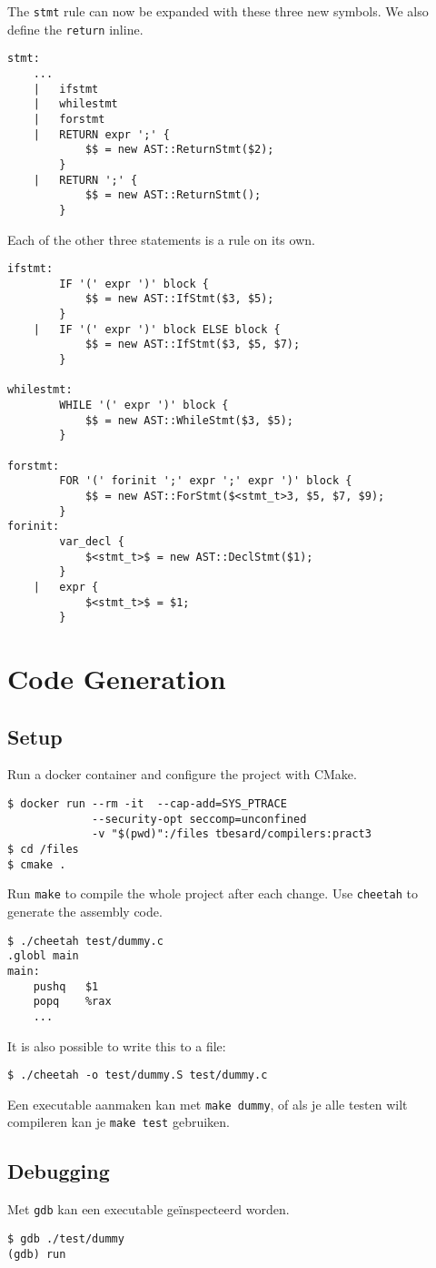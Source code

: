 \documentclass{report}
\begin{document}
The \texttt{stmt} rule can now be expanded with these three new symbols. We also define the \texttt{return} inline.
\begin{lstlisting}
stmt:
	...
	|	ifstmt
	|	whilestmt
	|	forstmt
	|	RETURN expr ';' {
			$$ = new AST::ReturnStmt($2);
	 	}
	|	RETURN ';' {
			$$ = new AST::ReturnStmt();
		}
\end{lstlisting}
Each of the other three statements is a rule on its own.
\begin{lstlisting}
ifstmt:
		IF '(' expr ')' block {
			$$ = new AST::IfStmt($3, $5);
		}
	|	IF '(' expr ')' block ELSE block {
			$$ = new AST::IfStmt($3, $5, $7);
		}

whilestmt:
		WHILE '(' expr ')' block {
			$$ = new AST::WhileStmt($3, $5);
		}
		
forstmt:
		FOR '(' forinit ';' expr ';' expr ')' block {
			$$ = new AST::ForStmt($<stmt_t>3, $5, $7, $9);
		}
forinit:
		var_decl {
			$<stmt_t>$ = new AST::DeclStmt($1);
		}
	| 	expr {
			$<stmt_t>$ = $1;
		}
\end{lstlisting}
	
	\chapter{Code Generation}
	\section{Setup}
	Run a docker container and configure the project with CMake.
	\begin{lstlisting}
$ docker run --rm -it  --cap-add=SYS_PTRACE 
             --security-opt seccomp=unconfined
             -v "$(pwd)":/files tbesard/compilers:pract3
$ cd /files
$ cmake .
	\end{lstlisting}
	Run \texttt{make} to compile the whole project after each change. Use \texttt{cheetah} to generate the assembly code.
	\begin{lstlisting}
$ ./cheetah test/dummy.c
.globl main
main:
	pushq	$1
	popq	%rax
	...
	\end{lstlisting}
	It is also possible to write this to a file:
\begin{lstlisting}
$ ./cheetah -o test/dummy.S test/dummy.c
\end{lstlisting}
	Een executable aanmaken kan met \texttt{make dummy}, of als je alle testen wilt compileren kan je \texttt{make test} gebruiken.
	
	\section{Debugging}
	Met \texttt{gdb} kan een executable geïnspecteerd worden.
	\begin{lstlisting}
$ gdb ./test/dummy
(gdb) run
	\end{lstlisting}
	
\end{document}

